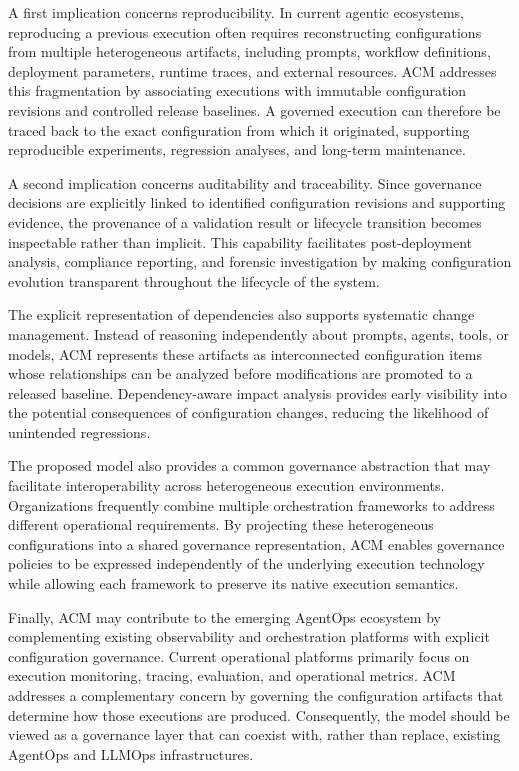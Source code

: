 \documentclass[10pt]{article}
\begin{document}
A first implication concerns reproducibility. In current agentic ecosystems, reproducing a previous execution often requires reconstructing configurations from multiple heterogeneous artifacts, including prompts, workflow definitions, deployment parameters, runtime traces, and external resources. ACM addresses this fragmentation by associating executions with immutable configuration revisions and controlled release baselines. A governed execution can therefore be traced back to the exact configuration from which it originated, supporting reproducible experiments, regression analyses, and long-term maintenance.

A second implication concerns auditability and traceability. Since governance decisions are explicitly linked to identified configuration revisions and supporting evidence, the provenance of a validation result or lifecycle transition becomes inspectable rather than implicit. This capability facilitates post-deployment analysis, compliance reporting, and forensic investigation by making configuration evolution transparent throughout the lifecycle of the system.

The explicit representation of dependencies also supports systematic change management. Instead of reasoning independently about prompts, agents, tools, or models, ACM represents these artifacts as interconnected configuration items whose relationships can be analyzed before modifications are promoted to a released baseline. Dependency-aware impact analysis provides early visibility into the potential consequences of configuration changes, reducing the likelihood of unintended regressions.

The proposed model also provides a common governance abstraction that may facilitate interoperability across heterogeneous execution environments. Organizations frequently combine multiple orchestration frameworks to address different operational requirements. By projecting these heterogeneous configurations into a shared governance representation, ACM enables governance policies to be expressed independently of the underlying execution technology while allowing each framework to preserve its native execution semantics.

Finally, ACM may contribute to the emerging AgentOps ecosystem by complementing existing observability and orchestration platforms with explicit configuration governance. Current operational platforms primarily focus on execution monitoring, tracing, evaluation, and operational metrics. ACM addresses a complementary concern by governing the configuration artifacts that determine how those executions are produced. Consequently, the model should be viewed as a governance layer that can coexist with, rather than replace, existing AgentOps and LLMOps infrastructures.
\end{document}
